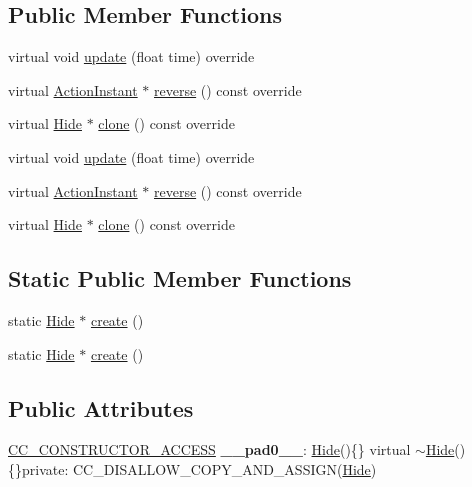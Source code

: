 \subsection*{Public Member Functions}
\begin{DoxyCompactItemize}
\item 
virtual void \hyperlink{classHide_a108b8127537cc5da94f63444e3fb23f3}{update} (float time) override
\item 
virtual \hyperlink{classActionInstant}{Action\+Instant} $\ast$ \hyperlink{classHide_add2d09abe89637c2e68e4196384a6dd9}{reverse} () const override
\item 
virtual \hyperlink{classHide}{Hide} $\ast$ \hyperlink{classHide_a93ed7a1853923c544ac4e1039e65e8a8}{clone} () const override
\item 
virtual void \hyperlink{classHide_ab63f0961b2bac19ff3fa4581e7342d9d}{update} (float time) override
\item 
virtual \hyperlink{classActionInstant}{Action\+Instant} $\ast$ \hyperlink{classHide_aed88024d6c8fc718c8e45307a158b913}{reverse} () const override
\item 
virtual \hyperlink{classHide}{Hide} $\ast$ \hyperlink{classHide_a5f8450e43c0f2997490fc745a47c6c3f}{clone} () const override
\end{DoxyCompactItemize}
\subsection*{Static Public Member Functions}
\begin{DoxyCompactItemize}
\item 
static \hyperlink{classHide}{Hide} $\ast$ \hyperlink{classHide_a5dad51d269e289a509714514d961f5c8}{create} ()
\item 
static \hyperlink{classHide}{Hide} $\ast$ \hyperlink{classHide_a5171daa685905b25ec058019bf5f2cbc}{create} ()
\end{DoxyCompactItemize}
\subsection*{Public Attributes}
\begin{DoxyCompactItemize}
\item 
\mbox{\label{classHide_a6ebbdb7e7a4a0c4302433373b8d2b1f6}} 
\hyperlink{_2cocos2d_2cocos_2base_2ccConfig_8h_a25ef1314f97c35a2ed3d029b0ead6da0}{C\+C\+\_\+\+C\+O\+N\+S\+T\+R\+U\+C\+T\+O\+R\+\_\+\+A\+C\+C\+E\+SS} {\bfseries \+\_\+\+\_\+pad0\+\_\+\+\_\+}\+: \hyperlink{classHide}{Hide}()\{\} virtual $\sim$\hyperlink{classHide}{Hide}()\{\}private\+: C\+C\+\_\+\+D\+I\+S\+A\+L\+L\+O\+W\+\_\+\+C\+O\+P\+Y\+\_\+\+A\+N\+D\+\_\+\+A\+S\+S\+I\+GN(\hyperlink{classHide}{Hide})
\end{DoxyCompactItemize}
